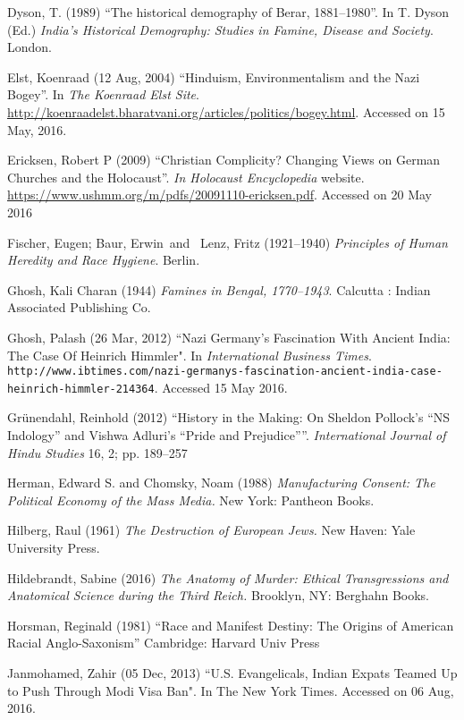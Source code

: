 \begin{thebibliography}{99}
Dyson, T. (1989) “The historical demography of Berar, 1881–1980”. In T. Dyson (Ed.) {\sl India’s Historical Demography: Studies in Famine, Disease and Society}. London. 

Elst, Koenraad (12 Aug, 2004) “Hinduism, Environmentalism and the Nazi Bogey”. In {\sl The Koenraad Elst Site}. \url{http://koenraadelst.bharatvani.org/articles/politics/bogey.html}. Accessed on 15 May, 2016.

Ericksen, Robert P (2009) “Christian Complicity? Changing Views on German Churches and the Holocaust”. {\sl In Holocaust Encyclopedia} website. \url{https://www.ushmm.org/m/pdfs/20091110-ericksen.pdf}. Accessed on 20 May 2016

Fischer, Eugen;  Baur, Erwin and  Lenz, Fritz  (1921--1940) {\sl Principles of Human Heredity and Race Hygiene}. Berlin.

Ghosh, Kali Charan (1944) {\sl Famines in Bengal, 1770--1943}. Calcutta : Indian Associated Publishing Co.

Ghosh, Palash (26 Mar, 2012) “Nazi Germany’s Fascination With Ancient India: The Case Of Heinrich Himmler". In {\sl International Business Times}.\\ {\tt http://www.ibtimes.com/nazi-germanys-fascination-\break ancient-india-case-heinrich-himmler-214364}. Accessed 15 May 2016.

Grünendahl, Reinhold (2012) “History in the Making: On Sheldon Pollock’s “NS Indology” and Vishwa Adluri’s “Pride and Prejudice””. {\sl International Journal of Hindu Studies} 16, 2; pp. 189--257

Herman, Edward S. and Chomsky, Noam (1988) {\sl Manufacturing Consent: The Political Economy of the Mass Media.} New York: Pantheon Books.

Hilberg, Raul (1961) {\sl The Destruction of European Jews.} New Haven: Yale University Press.

Hildebrandt, Sabine (2016) {\sl The Anatomy of Murder: Ethical Transgressions and Anatomical Science during the Third Reich.} Brooklyn, NY: Berghahn Books.

Horsman, Reginald (1981) “Race and Manifest Destiny: The Origins of American Racial Anglo-Saxonism” Cambridge: Harvard Univ Press

Janmohamed, Zahir (05 Dec, 2013) “U.S. Evangelicals, Indian Expats Teamed Up to Push Through Modi Visa Ban". In The New York Times. Accessed on 06 Aug, 2016.


\end{thebibliography}
